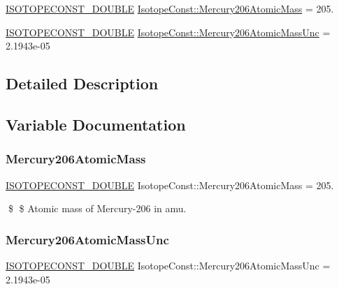 \begin{DoxyCompactItemize}
\item 
\mbox{\hyperlink{group___isotope_const-_macros_ga8f45a7272ce02c0b4c65c44636ed719a}{I\+S\+O\+T\+O\+P\+E\+C\+O\+N\+S\+T\+\_\+\+D\+O\+U\+B\+LE}} \mbox{\hyperlink{group___isotope_const-_mercury-_hg206_ga73b0f36d992fde5556da8970a147664a}{Isotope\+Const\+::\+Mercury206\+Atomic\+Mass}} = 205.
\item 
\mbox{\hyperlink{group___isotope_const-_macros_ga8f45a7272ce02c0b4c65c44636ed719a}{I\+S\+O\+T\+O\+P\+E\+C\+O\+N\+S\+T\+\_\+\+D\+O\+U\+B\+LE}} \mbox{\hyperlink{group___isotope_const-_mercury-_hg206_gad04617e6af1607b121f41975e6b094bd}{Isotope\+Const\+::\+Mercury206\+Atomic\+Mass\+Unc}} = 2.\+1943e-\/05
\end{DoxyCompactItemize}


\subsection{Detailed Description}


\subsection{Variable Documentation}
\mbox{\label{group___isotope_const-_mercury-_hg206_ga73b0f36d992fde5556da8970a147664a}} 
\subsubsection{\texorpdfstring{Mercury206\+Atomic\+Mass}{Mercury206AtomicMass}}
{\footnotesize\ttfamily \mbox{\hyperlink{group___isotope_const-_macros_ga8f45a7272ce02c0b4c65c44636ed719a}{I\+S\+O\+T\+O\+P\+E\+C\+O\+N\+S\+T\+\_\+\+D\+O\+U\+B\+LE}} Isotope\+Const\+::\+Mercury206\+Atomic\+Mass = 205.}

\$ \$ Atomic mass of Mercury-\/206 in amu. \mbox{\label{group___isotope_const-_mercury-_hg206_gad04617e6af1607b121f41975e6b094bd}} 
\subsubsection{\texorpdfstring{Mercury206\+Atomic\+Mass\+Unc}{Mercury206AtomicMassUnc}}
{\footnotesize\ttfamily \mbox{\hyperlink{group___isotope_const-_macros_ga8f45a7272ce02c0b4c65c44636ed719a}{I\+S\+O\+T\+O\+P\+E\+C\+O\+N\+S\+T\+\_\+\+D\+O\+U\+B\+LE}} Isotope\+Const\+::\+Mercury206\+Atomic\+Mass\+Unc = 2.\+1943e-\/05}

